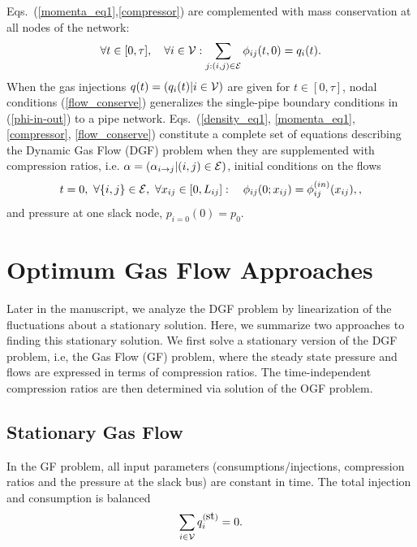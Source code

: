 \documentclass[10pt, conference, compsocconf]{IEEEtran}
\begin{document}
Eqs.~(\ref{momenta_eq1},\ref{compressor}) are complemented with mass conservation at all nodes of the network:
\begin{equation}
\forall t\in [0,\tau],\quad \forall i\in{\cal V}: \sum_{j:(i,j)\in{\cal E}}\phi_{ij}(t,0)=q_i(t).
\label{flow_conserve}
\end{equation}
When the gas injections $q(t)=(q_i(t)|i\in{\cal V})$ are given for $t\in[0,\tau]$, nodal conditions (\ref{flow_conserve}) generalizes the single-pipe boundary conditions in (\ref{phi-in-out}) to a pipe network. Eqs.~(\ref{density_eq1}, \ref{momenta_eq1}, \ref{compressor}, \ref{flow_conserve}) constitute a complete set of equations describing the Dynamic Gas Flow (DGF) problem when they are supplemented with compression ratios, i.e. $\alpha=(\alpha_{i\to j}|(i,j)\in{\cal E})$, initial conditions on the flows
\begin{equation}
t=0,\ \forall \{i,j\}\in{\cal E},\ \forall x_{ij}\in[0,L_{ij}]:\quad \phi_{ij}(0;x_{ij})=\phi^{(in)}_{ij}(x_{ij}), \label{phi-initial-netw},
\end{equation}
and pressure at one slack node, $p_{i=0}(0)=p_0$.








\section{Optimum Gas Flow Approaches}
\label{sec:OGF}


Later in the manuscript, we analyze the DGF problem by linearization of the fluctuations about a stationary solution.  Here, we summarize two approaches to finding this stationary solution.  We first solve a stationary version of the DGF problem, i.e, the Gas Flow (GF) problem, where the steady state pressure and flows are expressed in terms of compression ratios.  The time-independent compression ratios are then determined via solution of the OGF problem.

\subsection{Stationary Gas Flow}
\label{sec:steady}

In the GF problem, all input parameters (consumptions/injections, compression ratios and the pressure at the slack bus) are constant in time. The total injection and consumption is balanced
\begin{equation}
\sum_{i\in{\cal V}} q_i^{(\mbox{st})}=0. \label{ballance}
\end{equation}
\end{document}
